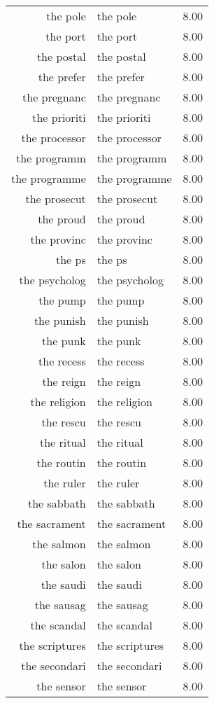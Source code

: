 \begin{table}[ht]
\begin{tabular}{rlr}
  the pole & the pole & 8.00 \\ 
  the port & the port & 8.00 \\ 
  the postal & the postal & 8.00 \\ 
  the prefer & the prefer & 8.00 \\ 
  the pregnanc & the pregnanc & 8.00 \\ 
  the prioriti & the prioriti & 8.00 \\ 
  the processor & the processor & 8.00 \\ 
  the programm & the programm & 8.00 \\ 
  the programme & the programme & 8.00 \\ 
  the prosecut & the prosecut & 8.00 \\ 
  the proud & the proud & 8.00 \\ 
  the provinc & the provinc & 8.00 \\ 
  the ps & the ps & 8.00 \\ 
  the psycholog & the psycholog & 8.00 \\ 
  the pump & the pump & 8.00 \\ 
  the punish & the punish & 8.00 \\ 
  the punk & the punk & 8.00 \\ 
  the recess & the recess & 8.00 \\ 
  the reign & the reign & 8.00 \\ 
  the religion & the religion & 8.00 \\ 
  the rescu & the rescu & 8.00 \\ 
  the ritual & the ritual & 8.00 \\ 
  the routin & the routin & 8.00 \\ 
  the ruler & the ruler & 8.00 \\ 
  the sabbath & the sabbath & 8.00 \\ 
  the sacrament & the sacrament & 8.00 \\ 
  the salmon & the salmon & 8.00 \\ 
  the salon & the salon & 8.00 \\ 
  the saudi & the saudi & 8.00 \\ 
  the sausag & the sausag & 8.00 \\ 
  the scandal & the scandal & 8.00 \\ 
  the scriptures & the scriptures & 8.00 \\ 
  the secondari & the secondari & 8.00 \\ 
  the sensor & the sensor & 8.00 \\ 

\end{tabular}
\end{table}
